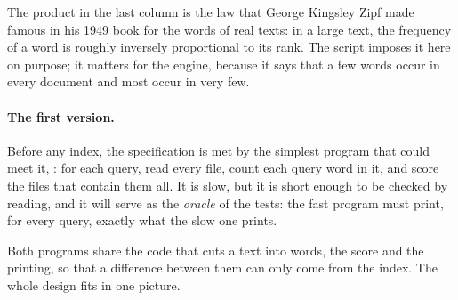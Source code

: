 \label{out:b1:project-text-search-engine:corpus}

The product in the last column is the law that George Kingsley Zipf made famous in his 1949 book for the words of real texts:
in a large text, the frequency of a word is roughly inversely proportional to its rank. The script imposes it here on
purpose; it matters for the engine, because it says that a few words occur in every document and most occur in very
few.

\paragraph{The first version.} Before any index, the specification is met by the simplest program that could meet it,
: for each query, read every file, count each query word in it, and score the files that contain them all.
It is slow, but it is short enough to be checked by reading, and it will serve as the \emph{oracle} of the tests: the
fast program must print, for every query, exactly what the slow one prints.

\label{lst:b1:project-text-search-engine:scan}

Both programs share the code that cuts a text into words, the score and the printing, so that a difference between
them can only come from the index. The whole design fits in one picture.

